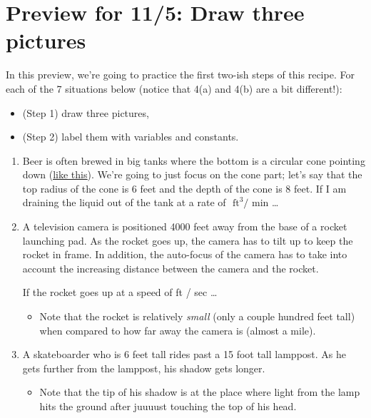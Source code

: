 \pagebreak

\section{Preview for 11/5: Draw three pictures}

In this preview, we're going to practice the first two-ish steps of this recipe. For each of the 7 situations below (notice that 4(a) and 4(b) are a bit different!):
\begin{itemize}
    \item (Step 1) draw three pictures, 
    \item (Step 2) label them with variables and constants.
\end{itemize}
    

\everymath{\displaystyle}
\begin{enumerate}[leftmargin=0pt]

\item Beer is often brewed in big tanks where the bottom is a circular cone pointing down (\underline{\href{https://thumb.wikimedia.org/wikipedia/commons/thumb/8/87/Cuves_de_fermentations.jpg/960px-Cuves_de_fermentations.jpg}{like this}}). We're going to just focus on the cone part; let's say that the top radius of the cone is 6 feet and the depth of the cone is 8 feet. 
If I am draining the liquid out of the tank at a rate of \underline{\phantom{??}} \(  \text{ ft}^3 / \text{ min}\) \ldots

\item A television camera is positioned 4000 feet away from the base of a rocket launching pad. As the rocket goes up, the camera has to tilt up to keep the rocket in frame. In addition, the auto-focus of the camera has to take into account the increasing distance between the camera and the rocket.

If the rocket goes up at a speed of \underline{\phantom{??}} ft / sec \ldots
\begin{itemize}
    \item Note that the rocket is relatively \textit{small} (only a couple hundred feet tall) when compared to how far away the camera is (almost a mile).
\end{itemize}

\item A skateboarder who is 6 feet tall rides past a 15 foot tall lamppost. As he gets further from the lamppost, his shadow gets longer. 

\begin{itemize}
    \item Note that the tip of his shadow is at the place where light from the lamp hits the ground after juuuust touching the top of his head.
\end{itemize}


\end{enumerate}
